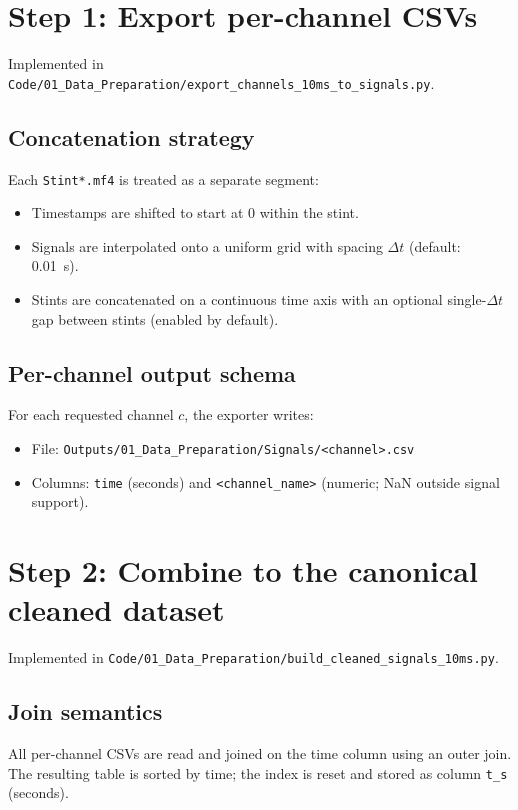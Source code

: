 \documentclass[11pt,a4paper]{article}
\begin{document}
\section{Step 1: Export per-channel CSVs}
Implemented in \texttt{Code/01\_Data\_Preparation/export\_channels\_10ms\_to\_signals.py}.

\subsection*{Concatenation strategy}
Each \texttt{Stint*.mf4} is treated as a separate segment:
\begin{itemize}
  \item Timestamps are shifted to start at 0 within the stint.
  \item Signals are interpolated onto a uniform grid with spacing $\Delta t$
        (default: \SI{0.01}{s}).
  \item Stints are concatenated on a continuous time axis with an optional
        single-$\Delta t$ gap between stints (enabled by default).
\end{itemize}

\subsection*{Per-channel output schema}
For each requested channel $c$, the exporter writes:
\begin{itemize}
  \item File: \texttt{Outputs/01\_Data\_Preparation/Signals/<channel>.csv}
  \item Columns: \texttt{time} (seconds) and \texttt{<channel\_name>} (numeric;
        NaN outside signal support).
\end{itemize}

\section{Step 2: Combine to the canonical cleaned dataset}
Implemented in \texttt{Code/01\_Data\_Preparation/build\_cleaned\_signals\_10ms.py}.

\subsection*{Join semantics}
All per-channel CSVs are read and joined on the time column using an outer join.
The resulting table is sorted by time; the index is reset and stored as column
\texttt{t\_s} (seconds).
\end{document}
